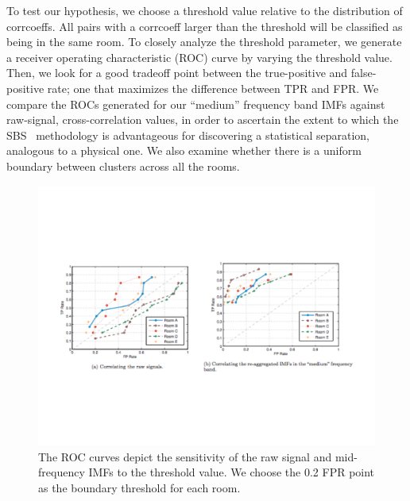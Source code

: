 To test our hypothesis, we choose a threshold value relative to the distribution of corrcoeffs.  
All pairs with a corrcoeff larger than the threshold will be classified as being in the same room.  To closely analyze the threshold parameter, 
we generate a receiver operating characteristic (ROC) curve by varying the threshold value.  Then, we look for a good tradeoff point between the true-positive and false-positive rate; one that maximizes the difference between TPR and FPR.  We compare the ROCs generated 
for our ``medium'' frequency band IMFs against raw-signal, cross-correlation values, in order to ascertain the extent to which 
the SBS~\cite{SBS} methodology is advantageous for discovering a statistical separation, analogous to a physical one.
We also examine whether there is a uniform boundary between clusters across all the rooms. 


\begin{figure}[ht!]
\centering
	 \includegraphics[width=1.00\textwidth]{figs/ROCgraphs}
\caption{The ROC curves depict the sensitivity of the raw signal and mid-frequency IMFs to the threshold value. We choose the 0.2 FPR point as the boundary threshold for each room. }
\label{fig:roc}
\end{figure}



